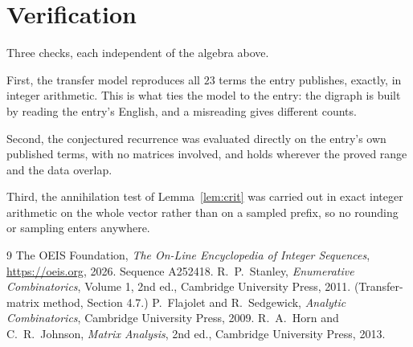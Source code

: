 \documentclass[11pt,a4paper]{article}
\theoremstyle{plain}
\theoremstyle{definition}
\begin{document}
\section{Verification}

Three checks, each independent of the algebra above.

First, the transfer model reproduces all $23$ terms the entry publishes, exactly, in
integer arithmetic. This is what ties the model to the entry: the digraph is built by reading
the entry's English, and a misreading gives different counts.

Second, the conjectured recurrence was evaluated directly on the entry's own published terms,
with no matrices involved, and holds wherever the proved range and the data overlap.

Third, the annihilation test of Lemma~\ref{lem:crit} was carried out in exact integer
arithmetic on the whole vector rather than on a sampled prefix, so no rounding or sampling
enters anywhere.

\begin{thebibliography}{9}
 The OEIS Foundation, \emph{The On-Line Encyclopedia of Integer
Sequences}, \url{https://oeis.org}, 2026. Sequence A252418.
 R.~P.~Stanley, \emph{Enumerative Combinatorics}, Volume 1, 2nd ed.,
Cambridge University Press, 2011. (Transfer-matrix method, Section 4.7.)
 P.~Flajolet and R.~Sedgewick, \emph{Analytic Combinatorics}, Cambridge
University Press, 2009.
 R.~A.~Horn and C.~R.~Johnson, \emph{Matrix Analysis}, 2nd ed., Cambridge
University Press, 2013.
\end{thebibliography}
\end{document}
